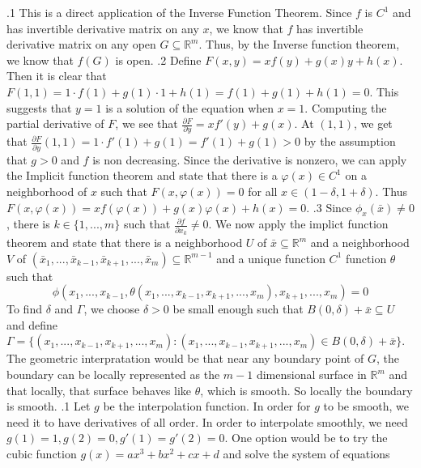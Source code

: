 \documentclass[12pt]{exam}
\begin{document}
\begin{questions}
.1\newline
This is a direct application of the Inverse Function Theorem. Since $f$ is $C^1$ and has invertible derivative matrix on any $x$, we know that $f$ has invertible derivative matrix on any open $G \subseteq \mathbb{R}^m$. Thus, by the Inverse function theorem, we know that $f(G)$ is open.
.2 \newline
Define $F(x,y) = xf(y)+g(x)y+h(x)$. Then it is clear that $F(1,1) = 1\cdot f(1)+g(1)\cdot 1+h(1) = f(1)+g(1)+h(1)=0$. This suggests that $y=1$ is a solution of the equation when $x=1$. Computing the partial derivative of $F$, we see that $\frac{\partial F}{\partial y} = xf'(y)+g(x)$. At $(1,1)$, we get that $\frac{\partial F}{\partial y}(1,1) = 1\cdot f'(1)+g(1) = f'(1)+g(1)>0$ by the assumption that $g>0$ and $f$ is non decreasing. Since the derivative is nonzero, we can apply the Implicit function theorem and state that there is a $\varphi(x) \in C^1 $ on a neighborhood of $x$ such that $F(x,\varphi(x)) =0$ for all $x \in (1-\delta, 1+\delta)$. Thus  $F(x,\varphi(x)) = xf(\varphi(x))+g(x)\varphi(x)+h(x)=0$.
.3 \newline
Since $\phi_x(\bar{x}) \neq 0$, there is $k \in \{1,...,m\}$ such that $\frac{\partial f}{\partial x_k} \neq 0$. We now apply the implict function theorem and state that there is a neighborhood $U$ of $\bar{x} \subseteq \mathbb{R}^m$ and a neighborhood $V$ of $(\bar{x}_1,..., \bar{x}_{k-1}, \bar{x}_{k+1}, ..., \bar{x}_m) \subseteq \mathbb{R}^{m-1}$ and a unique function $C^1$ function $\theta$ such that \[\phi(x_1, ..., x_{k-1}, \theta(x_1,...,x_{k-1},x_{k+1},...,x_m),x_{k+1},...,x_m) = 0\] To find $\delta$ and $\Gamma$, we choose $\delta>0$ be small enough such that $B(0, \delta) + \bar{x} \subseteq U$ and define $\Gamma = \{(x_1,...,x_{k-1},x_{k+1},...,x_m ): (x_1,...,x_{k-1},x_{k+1},...,x_m) \in B(0, \delta) + \bar{x} \}$. The geometric interpratation would be that near any boundary point of $G$, the boundary can be locally represented as the $m-1$ dimensional surface in $\mathbb{R}^m$ and that locally, that surface behaves like $\theta$, which is smooth. So locally the boundary is smooth.  
.1 \newline
Let $g$ be the interpolation function. In order for $g$ to be smooth, we need it to have derivatives of all order. In order to interpolate smoothly, we need $g(1)=1, g(2)=0, g'(1)=g'(2)=0$. One option would be to try the cubic function $g(x)=ax^3+bx^2+cx+d$ and solve the system of equations \[
\begin{aligned}

\end{aligned}\]
\end{questions}
\end{document}
